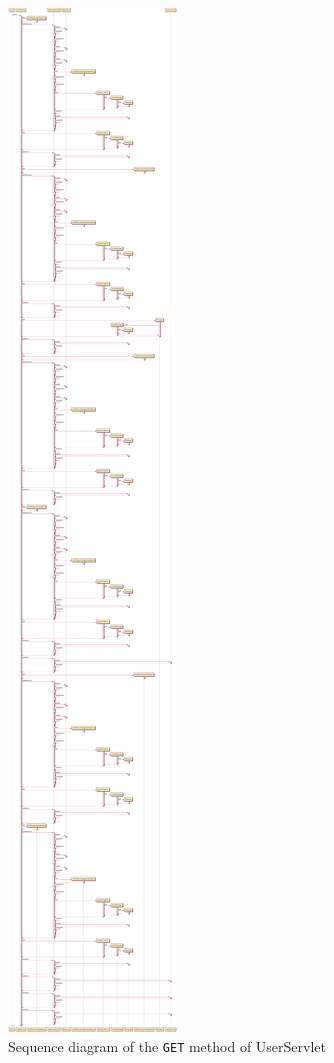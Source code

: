 \begin{figure}[H]
    \centering
    \includegraphics[width=\textwidth,height=0.95\textheight,keepaspectratio]{Schemas/UserServlet_doGet.svg.pdf}
    \caption{Sequence diagram of the \texttt{GET} method of UserServlet}
    \label{fig:UserServlet_doGet}
\end{figure}
